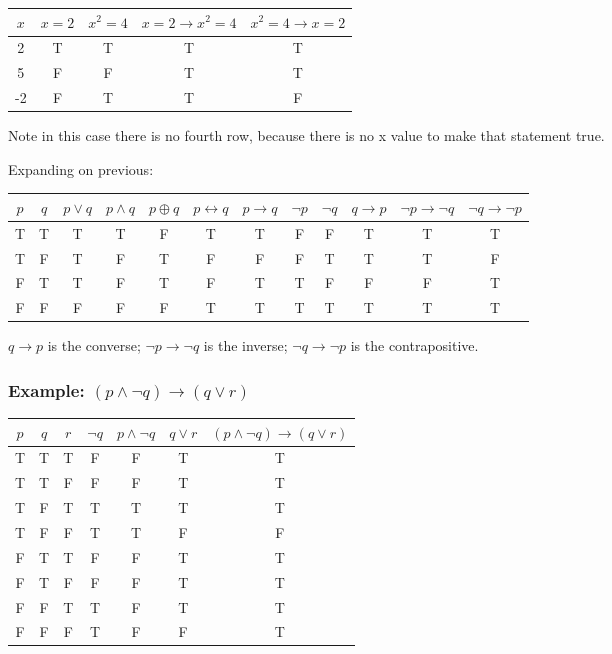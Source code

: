 \documentclass{article}
\theoremstyle{definition}
\begin{document}
\begin{tabular}{c|c|c|c|c}
  $x$ & $x=2$ & $x^2=4$ & $x=2 \rightarrow x^2=4$ & $x^2=4 \rightarrow x=2$ \\
  \hline
  2 & T & T & T & T \\
  5 & F & F & T & T \\
  -2 & F & T & T & F
\end{tabular}

Note in this case there is no fourth row, because there is no x value to make that statement true.

Expanding on previous:

\begin{tabular}{c | c | c | c | c | c | c | c | c | c | c | c}
  $p$ & $q$ & $p \lor q$ & $p \land q$ & $p \oplus q$ & $p \leftrightarrow q$ & $p \rightarrow q$ & $\neg p$ & $\neg q$ & $q \rightarrow p$ & $\neg p \rightarrow \neg q$ & $\neg q \rightarrow \neg p$ \\
  \hline
  T & T & T & T & F & T & T & F & F & T & T & T \\
  \hline
  T & F & T & F & T & F & F & F & T & T & T & F\\
  \hline
  F & T & T & F & T & F & T & T & F & F & F & T\\
  \hline
  F & F & F & F & F & T & T & T & T & T & T & T
\end{tabular}

$q \rightarrow p$ is the converse; $\neg p \rightarrow \neg q$ is the inverse; $\neg q \rightarrow \neg p$ is the contrapositive. 

\subsubsection*{Example: $(p \land \neg q) \rightarrow (q \lor r)$}
\begin{tabular}{c|c|c|c|c|c|c}
  $p$ & $q$ & $r$ & $\neg q$ & $p \land \neg q$ & $q \lor r$ & $(p \land \neg q) \rightarrow (q \lor r)$ \\
  \hline
  T & T & T & F & F & T & T \\
  T & T & F & F & F & T & T \\
  T & F & T & T & T & T & T \\
  T & F & F & T & T & F & F \\
  \hline
  F & T & T & F & F & T & T \\
  F & T & F & F & F & T & T \\
  F & F & T & T & F & T & T \\
  F & F & F & T & F & F & T
\end{tabular}
\end{document}
